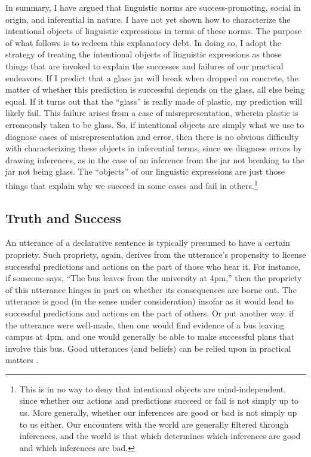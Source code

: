 In summary, I have argued that linguistic norms are success-promoting, social in origin, and inferential in nature. I have not yet shown how to characterize the intentional objects of linguistic expressions in terms of these norms. The purpose of what follows is to redeem this explanatory debt. In doing so, I adopt the strategy of treating the intentional objects of linguistic expressions as those things that are invoked to explain the successes and failures of our practical endeavors. If I predict that a glass jar will break when dropped on concrete, the matter of whether this prediction is successful depends on the glass, all else being equal. If it turns out that the ``glass'' is really made of plastic, my prediction will likely fail. This failure arises from a case of misrepresentation, wherein plastic is erroneously taken to be glass. So, if intentional objects are simply what we use to diagnose cases of misrepresentation and error, then there is no obvious difficulty with characterizing these objects in inferential terms, since we diagnose errors by drawing inferences, as in the case of an inference from the jar not breaking to the jar not being glass. The ``objects'' of our linguistic expressions are just those things that explain why we succeed in some cases and fail in others.\footnote{This is in no way to deny that intentional objects are mind-independent, since whether our actions and predictions succeed or fail is not simply up to us. More generally, whether our inferences are good or bad is not simply up to us either. Our encounters with the world are generally filtered through inferences, and the world is that which determines which inferences are good and which inferences are bad.} 
 
\subsection{Truth and Success}

An utterance of a declarative sentence is typically presumed to have a certain propriety. Such propriety, again, derives from the utterance's propensity to license successful predictions and actions on the part of those who hear it. For instance, if someone says, ``The bus leaves from the university at 4pm,'' then the propriety of this utterance hinges in part on whether its consequences are borne out. The utterance is good (in the sense under consideration) insofar as it would lead to successful predictions and actions on the part of others. Or put another way, if the utterance were well-made, then one would find evidence of a bus leaving campus at 4pm, and one would generally be able to make successful plans that involve this bus. Good utterances (and beliefs) can be relied upon in practical matters \citep{Misak:2007}. 

